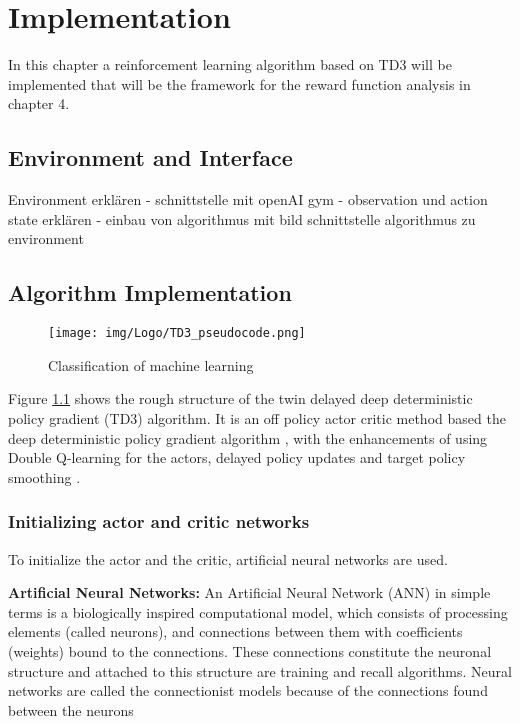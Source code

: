 \chapter{Implementation}

In this chapter a reinforcement learning algorithm based on TD3 will be implemented that will be the framework for the reward function analysis in chapter 4.

\section{Environment and Interface}
Environment erklären - schnittstelle mit openAI gym - observation und action state erklären - einbau von algorithmus mit bild schnittstelle algorithmus zu environment 

\section{Algorithm Implementation}

\begin{figure} 
	\centering
	\texttt{[image: img/Logo/TD3\_pseudocode.png]}
	\caption{Classification of machine learning}
	\label{fig:TD3_pseudo}
\end{figure}

Figure \ref{fig:TD3_pseudo} shows the rough structure of the twin delayed deep deterministic policy gradient (TD3) algorithm. It is an off policy actor critic method based the deep deterministic policy gradient algorithm \cite{lillicrap2015continuous}, with the enhancements of using Double Q-learning for the actors, delayed policy updates and target policy smoothing \cite{fujimoto2018}.

\subsection{Initializing actor and critic networks}
To initialize the actor and the critic, artificial neural networks are used.

\textbf{Artificial Neural Networks:}
An Artificial Neural Network (ANN) in simple terms is a biologically inspired
computational model, which consists of processing elements (called neurons), and
connections between them with coefficients (weights) bound to the connections.
These connections constitute the neuronal structure and attached to this structure are
training and recall algorithms. Neural networks are called the connectionist models
because of the connections found between the neurons
